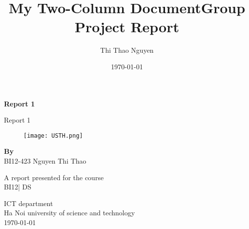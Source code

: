 \documentclass{article}
\title{My Two-Column Document}
\title{Group Project Report}
\author{Thi Thao Nguyen}
\date{\today}
\begin{document}
\begin{titlepage}

    \centering
    
    \Huge
    \textbf{Report 1}
    
    \vspace{0.5cm}
    \LARGE
    Report 1

\begin{figure}[h]
\centering
\texttt{[image: USTH.png]}
\end{figure}

 


    \vspace{1cm}

    \textbf{By}\\
     BI12-423 Nguyen Thi Thao

    \vfill
    
    A report presented for the course\\
    BI12| DS
    
    \vspace{0.8cm}
    
    \Large
    ICT department\\
    Ha Noi university of science and technology\\
    \today
    
\end{titlepage}




\tableofcontents
\newpage
\end{document}
